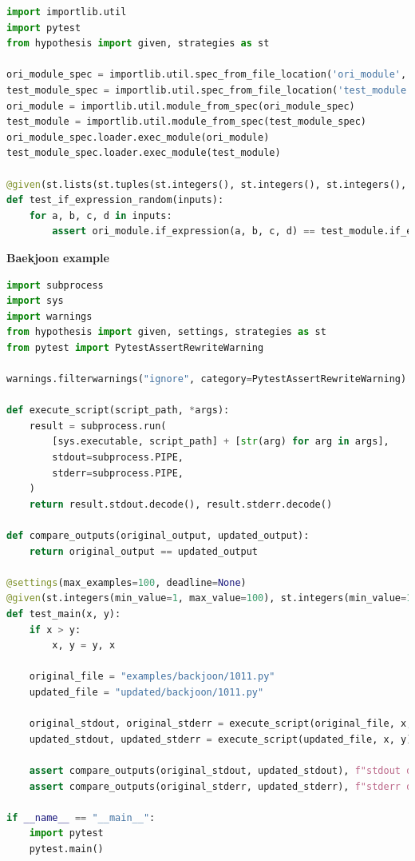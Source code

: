 \documentclass[11pt]{article}
\begin{document}
\begin{lstlisting}[language=python]
import importlib.util
import pytest
from hypothesis import given, strategies as st

ori_module_spec = importlib.util.spec_from_file_location('ori_module', './examples/simple/diff_example2.py')
test_module_spec = importlib.util.spec_from_file_location('test_module', './updated/simple/diff_example2.py')
ori_module = importlib.util.module_from_spec(ori_module_spec)
test_module = importlib.util.module_from_spec(test_module_spec)
ori_module_spec.loader.exec_module(ori_module)
test_module_spec.loader.exec_module(test_module)

@given(st.lists(st.tuples(st.integers(), st.integers(), st.integers(), st.integers()), min_size=100, max_size=100, unique=True))
def test_if_expression_random(inputs):
    for a, b, c, d in inputs:
        assert ori_module.if_expression(a, b, c, d) == test_module.if_expression(a, b, c, d)
\end{lstlisting}


\textbf{Baekjoon example}

\begin{lstlisting}[language=python]
import subprocess
import sys
import warnings
from hypothesis import given, settings, strategies as st
from pytest import PytestAssertRewriteWarning

warnings.filterwarnings("ignore", category=PytestAssertRewriteWarning)

def execute_script(script_path, *args):
    result = subprocess.run(
        [sys.executable, script_path] + [str(arg) for arg in args],
        stdout=subprocess.PIPE,
        stderr=subprocess.PIPE,
    )
    return result.stdout.decode(), result.stderr.decode()

def compare_outputs(original_output, updated_output):
    return original_output == updated_output

@settings(max_examples=100, deadline=None)
@given(st.integers(min_value=1, max_value=100), st.integers(min_value=1, max_value=100))
def test_main(x, y):
    if x > y:
        x, y = y, x 

    original_file = "examples/backjoon/1011.py"
    updated_file = "updated/backjoon/1011.py" 
    
    original_stdout, original_stderr = execute_script(original_file, x, y)
    updated_stdout, updated_stderr = execute_script(updated_file, x, y)
    
    assert compare_outputs(original_stdout, updated_stdout), f"stdout differs for inputs: x={x}, y={y}"
    assert compare_outputs(original_stderr, updated_stderr), f"stderr differs for inputs: x={x}, y={y}"

if __name__ == "__main__":
    import pytest
    pytest.main()
\end{lstlisting}
\end{document}
